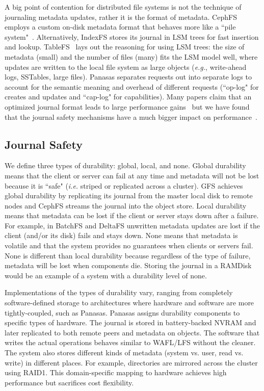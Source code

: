 A big point of contention for distributed file systems is not the technique of
journaling metadata updates, rather it is the format of metadata. CephFS
employs a custom on-disk metadata format that behaves more like a ``pile
system"~\cite{weil:phdthesis07}. Alternatively, IndexFS stores its journal in
LSM trees for fast insertion and lookup.  TableFS~\cite{ren:atc2013-tablefs}
lays out the reasoning for using LSM trees: the size of metadata (small) and
the number of files (many) fits the LSM model well, where updates are written
to the local file system as large objects ({\it e.g.}, write-ahead logs,
SSTables, large files). Panasas separates requests out into separate logs to
account for the semantic meaning and overhead of different requests (``op-log"
for creates and updates and ``cap-log" for capabilities).  Many papers claim
that an optimized journal format leads to large performance
gains~\cite{ren:atc2013-tablefs, ren:sc2014-indexfs, zheng:pdsw2014-batchfs}
but we have found that the journal safety mechanisms have a much bigger impact
on performance~\cite{sevilla:ipdps18-cudele}.

\subsection{Journal Safety}

We define three types of durability: global, local, and none.  Global
durability means that the client or server can fail at any time and metadata
will not be lost because it is ``safe" ({\it i.e.} striped or replicated across
a cluster). GFS achieves global durability by replicating its journal from the
master local disk to remote nodes and CephFS streams the journal into the
object store. Local durability means that metadata can be lost if the client or
server stays down after a failure. For example, in BatchFS and DeltaFS
unwritten metadata updates are lost if the client (and/or its disk) fails and
stays down.  None means that metadata is volatile and that the system provides
no guarantees when clients or servers fail.  None is different than local
durability because regardless of the type of failure, metadata will be lost
when components die. Storing the journal in a RAMDisk would be an example of a
system with a durability level of none.

Implementations of the types of durability vary, ranging from completely
software-defined storage to architectures where hardware and software are more
tightly-coupled, such as Panasas. Panasas assigns durability components to
specific types of hardware. The journal is stored in battery-backed NVRAM and
later replicated to both remote peers and metadata on objects. The software
that writes the actual operations behaves similar to WAFL/LFS without the
cleaner. The system also stores different kinds of metadata (system vs. user,
read vs. write) in different places. For example, directories are mirrored
across the cluster using RAID1. This domain-specific mapping to hardware
achieves high performance but sacrifices cost flexibility.

